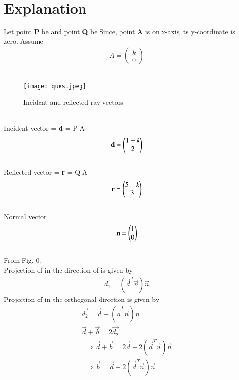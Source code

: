 \documentclass[journal,12pt,twocolumn]{IEEEtran}
\begin{document}
\section{Explanation}
Let point \textbf{P} be  and point \textbf{Q} be 
Since, point \textbf{A} is on x-axis, ts y-coordinate is zero.
Assume \begin{align}
    A=\begin{pmatrix} k \\ 0 \end{pmatrix}
\end{align} \\
\begin{figure}[h]
\centering
\texttt{[image: ques.jpeg]}
\caption{Incident and reflected ray vectors}
\label{fig:}
\end{figure}
\\
Incident vector = \textbf{d} = P-A
\begin{align}
    \textbf{d}=\begin{pmatrix}1-k \\ 2\end{pmatrix}
\end{align}
\\
Reflected vector = \textbf{r} = Q-A
\begin{align}
    \textbf{r}=\begin{pmatrix}5-k \\ 3\end{pmatrix}
\end{align}
\\
Normal vector
\begin{align}
    \textbf{n}=\begin{pmatrix}1\\0\end{pmatrix}
\end{align}
\\
From Fig. 0, \\
Projection of  in the direction of  is given by\\
\begin{align}
\Vec{d_{1}}=(\Vec{d}^{T}\Vec{n}) \Vec{n}
\end{align}
Projection of  in the orthogonal direction is given by\\
\begin{align}
\Vec{d_{2}}=\vec{d}-(\Vec{d}^{T}{\Vec{n}}) \Vec{n}
\\
\Vec{d}+\vec{b}=2\Vec{d_{2}} \\
\implies \Vec{d}+\vec{b}=2\vec{d}-2(\Vec{d}^{T}{\Vec{n}}) \Vec{n}\\
\implies \vec{b}=\vec{d}-2(\vec{d}^{T}\vec{n})\vec{n}
\end{align}
\end{document}
